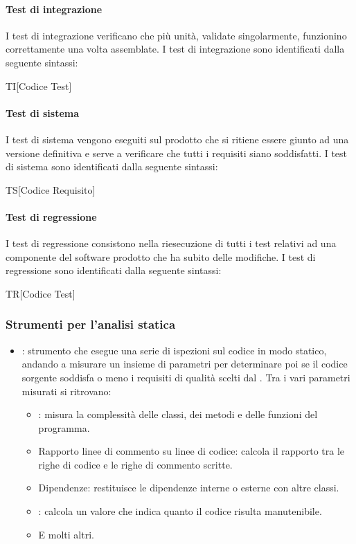 \paragraph{Test di integrazione}
I test di integrazione verificano che più unità, validate singolarmente, funzionino
correttamente una volta assemblate. I test di integrazione sono identificati dalla seguente sintassi:
\begin{center}
  TI[Codice Test]
\end{center}

\paragraph{Test di sistema}
I test di sistema vengono eseguiti sul prodotto che si ritiene essere giunto ad
una versione definitiva e serve a verificare che tutti i requisiti siano soddisfatti. I test di sistema sono identificati dalla seguente sintassi:
\begin{center}
  TS[Codice Requisito]
\end{center}

\paragraph{Test di regressione}
I test di regressione consistono nella riesecuzione di tutti i test relativi ad una
componente del software prodotto che ha subito delle modifiche. I test di regressione sono identificati dalla seguente sintassi:
\begin{center}
  TR[Codice Test]
\end{center}


\subsubsection{Strumenti per l'analisi statica}
\begin{itemize}
  \item \textbf{}: strumento che esegue una serie di ispezioni sul codice in modo statico, andando a misurare un insieme di parametri per determinare poi se il codice sorgente soddisfa o meno i requisiti di qualità scelti dal . Tra i vari parametri misurati si ritrovano:
  \begin{itemize}
    \item \textbf{}: misura la complessità delle classi, dei metodi e delle funzioni del programma.
    \item Rapporto linee di commento su linee di codice: calcola il rapporto tra
    le righe di codice e le righe di commento scritte.
    \item Dipendenze: restituisce le dipendenze interne o esterne con altre
    classi.
    \item \textbf{}: calcola un valore che indica quanto il
    codice risulta manutenibile.
    \item E molti altri.
  \end{itemize}
\end{itemize}

